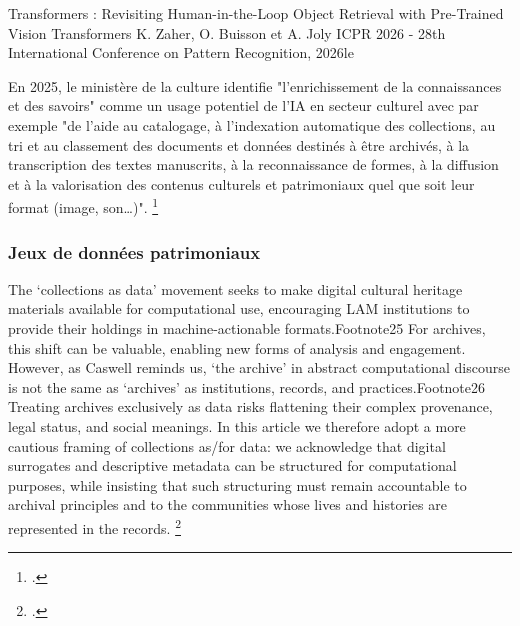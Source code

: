 Transformers : Revisiting Human-in-the-Loop Object Retrieval with Pre-Trained Vision Transformers  K. Zaher, O. Buisson et A. Joly ICPR 2026 - 28th International Conference on Pattern Recognition, 2026le 


En 2025, le ministère de la culture identifie "l'enrichissement de la connaissances et des savoirs" comme un usage potentiel de l'IA en secteur culturel avec par exemple "de l’aide au catalogage, à l’indexation automatique des collections, au tri et au classement des documents et données destinés à être archivés, à la transcription des textes manuscrits, à la reconnaissance de formes, à la diffusion et à la valorisation des contenus culturels et patrimoniaux quel que soit leur format (image, son…)". \footcite{2025a}


\subsubsection{Jeux de données patrimoniaux} 

The ‘collections as data’ movement seeks to make digital cultural heritage materials available for computational use, encouraging LAM institutions to provide their holdings in machine-actionable formats.Footnote25 For archives, this shift can be valuable, enabling new forms of analysis and engagement. However, as Caswell reminds us, ‘the archive’ in abstract computational discourse is not the same as ‘archives’ as institutions, records, and practices.Footnote26 Treating archives exclusively as data risks flattening their complex provenance, legal status, and social meanings. In this article we therefore adopt a more cautious framing of collections as/for data: we acknowledge that digital surrogates and descriptive metadata can be structured for computational purposes, while insisting that such structuring must remain accountable to archival principles and to the communities whose lives and histories are represented in the records. \footcite{colavizza2026}

